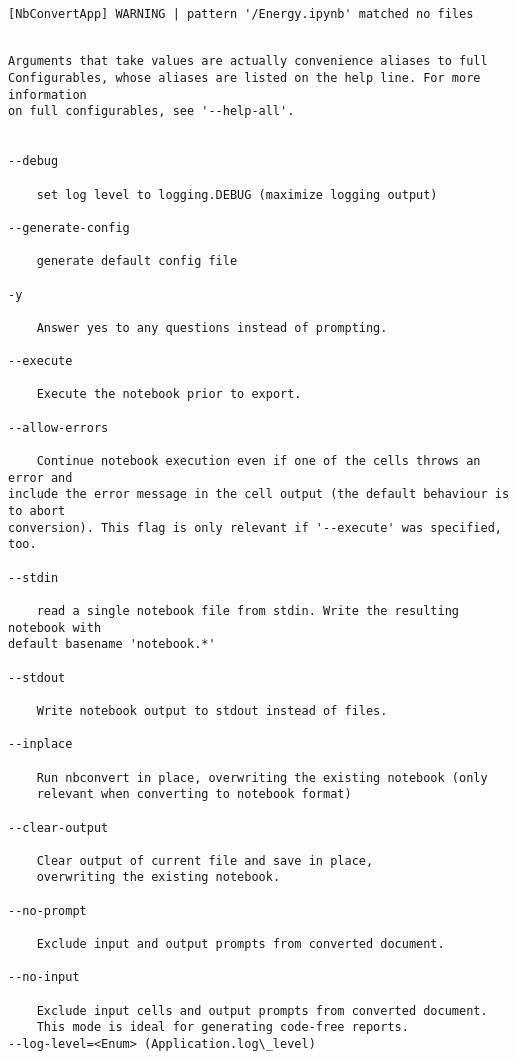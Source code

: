 \documentclass[11pt]{article}
\begin{document}
    \begin{Verbatim}[commandchars=\\\{\}]
[NbConvertApp] WARNING | pattern '/Energy.ipynb' matched no files
    \end{Verbatim}

    \begin{Verbatim}[commandchars=\\\{\}]

Arguments that take values are actually convenience aliases to full
Configurables, whose aliases are listed on the help line. For more information
on full configurables, see '--help-all'.


--debug

    set log level to logging.DEBUG (maximize logging output)

--generate-config

    generate default config file

-y

    Answer yes to any questions instead of prompting.

--execute

    Execute the notebook prior to export.

--allow-errors

    Continue notebook execution even if one of the cells throws an error and
include the error message in the cell output (the default behaviour is to abort
conversion). This flag is only relevant if '--execute' was specified, too.

--stdin

    read a single notebook file from stdin. Write the resulting notebook with
default basename 'notebook.*'

--stdout

    Write notebook output to stdout instead of files.

--inplace

    Run nbconvert in place, overwriting the existing notebook (only
    relevant when converting to notebook format)

--clear-output

    Clear output of current file and save in place,
    overwriting the existing notebook.

--no-prompt

    Exclude input and output prompts from converted document.

--no-input

    Exclude input cells and output prompts from converted document.
    This mode is ideal for generating code-free reports.
--log-level=<Enum> (Application.log\_level)


\end{Verbatim}
\end{document}
